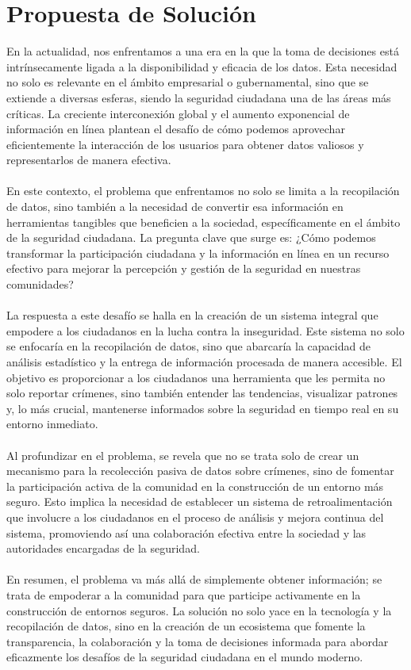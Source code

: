 \documentclass{article}
\begin{document}
\tableofcontents
\newpage
\listoftables
\listoffigures
\newpage

\section{Propuesta de Solución}
En la actualidad, nos enfrentamos a una era en la que la toma de decisiones está intrínsecamente ligada a la disponibilidad y eficacia de los datos. Esta necesidad no solo es relevante en el ámbito empresarial o gubernamental, sino que se extiende a diversas esferas, siendo la seguridad ciudadana una de las áreas más críticas. La creciente interconexión global y el aumento exponencial de información en línea plantean el desafío de cómo podemos aprovechar eficientemente la interacción de los usuarios para obtener datos valiosos y representarlos de manera efectiva.
\\
\\En este contexto, el problema que enfrentamos no solo se limita a la recopilación de datos, sino también a la necesidad de convertir esa información en herramientas tangibles que beneficien a la sociedad, específicamente en el ámbito de la seguridad ciudadana. La pregunta clave que surge es: ¿Cómo podemos transformar la participación ciudadana y la información en línea en un recurso efectivo para mejorar la percepción y gestión de la seguridad en nuestras comunidades?
\\
\\La respuesta a este desafío se halla en la creación de un sistema integral que empodere a los ciudadanos en la lucha contra la inseguridad. Este sistema no solo se enfocaría en la recopilación de datos, sino que abarcaría la capacidad de análisis estadístico y la entrega de información procesada de manera accesible. El objetivo es proporcionar a los ciudadanos una herramienta que les permita no solo reportar crímenes, sino también entender las tendencias, visualizar patrones y, lo más crucial, mantenerse informados sobre la seguridad en tiempo real en su entorno inmediato.
\\
\\Al profundizar en el problema, se revela que no se trata solo de crear un mecanismo para la recolección pasiva de datos sobre crímenes, sino de fomentar la participación activa de la comunidad en la construcción de un entorno más seguro. Esto implica la necesidad de establecer un sistema de retroalimentación que involucre a los ciudadanos en el proceso de análisis y mejora continua del sistema, promoviendo así una colaboración efectiva entre la sociedad y las autoridades encargadas de la seguridad.
\\
\\En resumen, el problema va más allá de simplemente obtener información; se trata de empoderar a la comunidad para que participe activamente en la construcción de entornos seguros. La solución no solo yace en la tecnología y la recopilación de datos, sino en la creación de un ecosistema que fomente la transparencia, la colaboración y la toma de decisiones informada para abordar eficazmente los desafíos de la seguridad ciudadana en el mundo moderno.
\end{document}
